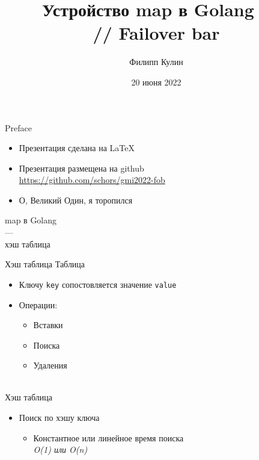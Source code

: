 \documentclass[aspectratio=169]{beamer}
\title{Устройство map в Golang ~\\// Failover bar}
\author{Филипп Кулин}
\date{20 июня 2022}
\begin{document}
\begin{frame}
\titlepage
\end{frame}

\begin{frame}{Preface}
        \begin{itemize}
                \item Презентация сделана на \LaTeX
                \item Презентация размещена на github\\
                \textcolor{blue}{\href{https://github.com/schors/gmi2022-fob}{https://github.com/schors/gmi2022-fob}}
                \item<2-> О, Великий Один, я торопился
        \end{itemize}
\end{frame}

\begin{frame}
        \center \huge map в Golang \\ --- \\ хэш таблица
\end{frame}

\begin{frame}{Хэш таблица}
        Таблица
        \begin{itemize}
                \item Ключу \texttt{key} сопостовляется значение \texttt{value}
                \item Операции:
                \begin{itemize}
                        \item Вставки
                        \item Поиска
                        \item Удаления
                \end{itemize}
        \end{itemize}
        ~\\
        Хэш таблица
        \begin{itemize}
                \item Поиск по хэшу ключа
                \begin{itemize}
                        \item Константное или линейное время поиска \\
                        \textit{\small O(1) или O(n)}
                \end{itemize}
        \end{itemize}
\end{frame}
\end{document}
